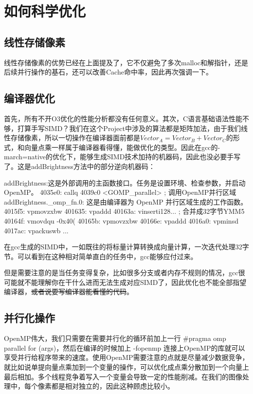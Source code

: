 \documentclass[11pt]{article}
\begin{document}
\section{如何科学优化}

\subsection{线性存储像素}
线性存储像素的优势已经在上面提及了，它不仅避免了多次malloc和解指针，还是后续并行操作的基石，还可以改善Cache命中率，因此再次强调一下。
\subsection{编译器优化}
首先，所有不开O3优化的性能分析都没有任何意义。其次，C语言基础语法性能不够，打算手写SIMD？我们在这个Project中涉及的算法都是矩阵加法，由于我们线性存储像素，所以一切操作在编译器面前都是$Vector_A = Vector_B + Vector_C$的形式，和向量点乘一样属于编译器看得懂，能做优化的类型。因此在gcc的-march=native的优化下，能够生成SIMD技术加持的机器码，因此也没必要手写了。这是addBrightness方法中的部分逆向机器码：

\begin{commandline}
    addBrightness:这是外部调用的主函数接口。任务是设置环境、检查参数，并启动OpenMP。
    4035e0:	callq  4039c0 <GOMP_parallel>  ; 调用OpenMP并行区域
    addBrightness._omp_fn.0: 这是由编译器为 OpenMP 并行区域生成的工作函数。
    4015f5:	vpmovzxbw %
    401635:	vpaddd %
    40163a: vinserti128...               ; 合并成32字节YMM5
    40164f: vmovdqu -0x40(%
    40165b: vpmovzxbw %
    40166e: vpaddd %
    4016a0:	vpminsd %
    4017ac:	vpackuswb %
    ...
\end{commandline}
在gcc生成的SIMD中，一如既往的将标量计算转换成向量计算，一次迭代处理32字节。可以看到在这种相对简单直白的任务中，gcc能够应付过来。


但是需要注意的是当任务变得复杂，比如很多分支或者内存不规则的情况，gcc很可能就不能理解你在干什么进而无法生成对应SIMD了，因此优化也不能全部指望编译器，\sout{或者说要写编译器能看懂的代码}。
\subsection{并行化操作}
OpenMP伟大，我们只需要在需要并行化的循环前加上一行 \#pragma omp parallel for (args)，然后在编译的时候加上 -fopenmp 连接上OpenMP的库就可以享受并行给程序带来的速度。使用OpenMP需要注意的点就是尽量减少数据竞争，就比如说单提向量点乘加到一个变量的操作，可以优化成点乘分散加到一个向量上最后相加。多个线程竞争着写入一个变量会导致一定的性能削减。在我们的图像处理中，每个像素都是相对独立的，因此这种顾虑比较小。
\end{document}
